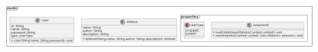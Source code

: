 \begin{center}
            \includegraphics[width=19cm, height=19cm, keepaspectratio]{content/img/models.png}


\end{center}
